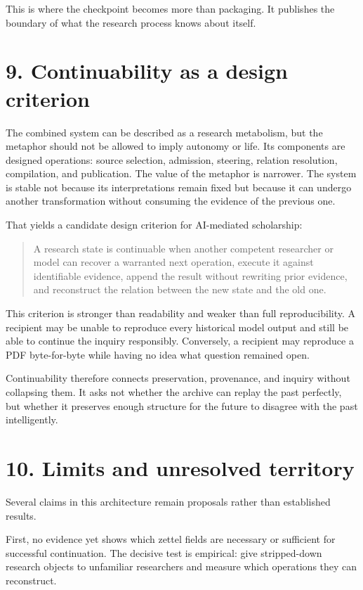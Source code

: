 \documentclass[
  11pt,
]{article}
\begin{document}
This is where the checkpoint becomes more than packaging. It publishes
the boundary of what the research process knows about itself.

\section{9. Continuability as a design
criterion}\label{continuability-as-a-design-criterion}

The combined system can be described as a research metabolism, but the
metaphor should not be allowed to imply autonomy or life. Its components
are designed operations: source selection, admission, steering, relation
resolution, compilation, and publication. The value of the metaphor is
narrower. The system is stable not because its interpretations remain
fixed but because it can undergo another transformation without
consuming the evidence of the previous one.

That yields a candidate design criterion for AI-mediated scholarship:

\begin{quote}
A research state is continuable when another competent researcher or
model can recover a warranted next operation, execute it against
identifiable evidence, append the result without rewriting prior
evidence, and reconstruct the relation between the new state and the old
one.
\end{quote}

This criterion is stronger than readability and weaker than full
reproducibility. A recipient may be unable to reproduce every historical
model output and still be able to continue the inquiry responsibly.
Conversely, a recipient may reproduce a PDF byte-for-byte while having
no idea what question remained open.

Continuability therefore connects preservation, provenance, and inquiry
without collapsing them. It asks not whether the archive can replay the
past perfectly, but whether it preserves enough structure for the future
to disagree with the past intelligently.

\section{10. Limits and unresolved
territory}\label{limits-and-unresolved-territory}

Several claims in this architecture remain proposals rather than
established results.

First, no evidence yet shows which zettel fields are necessary or
sufficient for successful continuation. The decisive test is empirical:
give stripped-down research objects to unfamiliar researchers and
measure which operations they can reconstruct.
\end{document}
